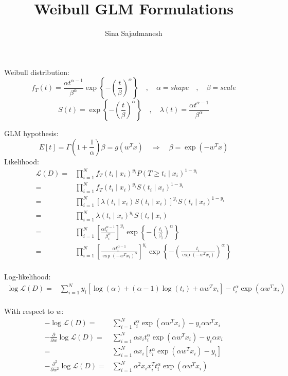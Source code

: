 \documentclass[]{article}
\title{Weibull GLM Formulations}
\author{Sina Sajadmanesh}
\begin{document}
\maketitle

Weibull distribution:
\[f_T(t)=\frac{\alpha t^{\alpha-1}}{\beta^\alpha}\exp\left\lbrace-(\frac{t}{\beta})^\alpha\right\rbrace\quad,\quad\alpha=shape\quad,\quad\beta=scale\]
\[S(t)=\exp\left\lbrace-(\frac{t}{\beta})^\alpha\right\rbrace\quad,\quad\lambda(t)=\frac{\alpha t^{\alpha-1}}{\beta^\alpha}\]

GLM hypothesis:
\[E[t]=\Gamma(1+\frac{1}{\alpha})\beta=g(w^Tx)\quad\Longrightarrow\quad\beta=\exp(-w^Tx)\]
Likelihood:
\begin{equation*}
\begin{split}
\mathcal{L}(D)=&\prod_{i=1}^{N}f_T(t_i\mid x_i)^{y_i}P(T\ge t_i\mid x_i)^{1-y_i}\\
=&\prod_{i=1}^{N}f_T(t_i\mid x_i)^{y_i}S(t_i\mid x_i)^{1-y_i}\\
=&\prod_{i=1}^{N}[\lambda(t_i\mid x_i)S(t_i\mid x_i)]^{y_i}S(t_i\mid x_i)^{1-y_i}\\
=&\prod_{i=1}^{N}\lambda(t_i\mid x_i)^{y_i}S(t_i\mid x_i)\\
=&\prod_{i=1}^{N}\left[\frac{\alpha t_i^{\alpha-1}}{\beta_i^\alpha}\right]^{y_i}\exp\left\lbrace-(\frac{t_i}{\beta_i})^\alpha\right\rbrace\\
=&\prod_{i=1}^{N}\left[\frac{\alpha t_i^{\alpha-1}}{\exp(-w^Tx_i)^\alpha}\right]^{y_i}\exp\left\lbrace-(\frac{t_i}{\exp(-w^Tx_i)})^\alpha\right\rbrace\\
\end{split}
\end{equation*}

Log-likelihood:
\begin{equation*}
\begin{split}
\log\mathcal{L}(D)
=&\sum_{i=1}^{N}y_i\left[\log(\alpha)+(\alpha-1)\log(t_i)+\alpha w^Tx_i\right]-t_i^\alpha\exp(\alpha w^Tx_i)\\
\end{split}
\end{equation*}

With respect to $w$:
\begin{equation*}
\begin{split}
-\log\mathcal{L}(D)=&\sum_{i=1}^{N}t_i^\alpha\exp(\alpha w^Tx_i)-y_i\alpha w^Tx_i\\
-\frac{\partial}{\partial w}\log\mathcal{L}(D)=&\sum_{i=1}^{N}\alpha x_it_i^\alpha\exp(\alpha w^Tx_i)-y_i\alpha x_i\\
=&\sum_{i=1}^{N}\alpha x_i\left[t_i^\alpha\exp(\alpha w^Tx_i)-y_i\right]\\
-\frac{\partial^2}{\partial w^2}\log\mathcal{L}(D)=&\sum_{i=1}^{N}\alpha^2x_ix_i^Tt_i^\alpha\exp(\alpha w^Tx_i)\\
\end{split}
\end{equation*}
\end{document}
